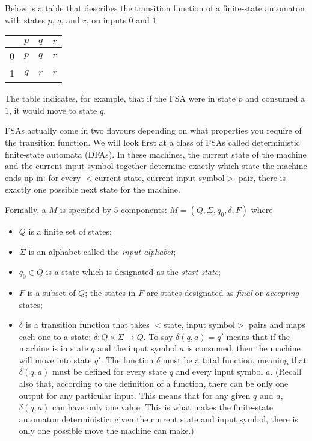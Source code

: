 \begin{example} Below is a table that describes the transition function of a 
finite-state automaton with states $p$, $q$, and $r$, on inputs $0$ and $1$.


\begin{center}
\begin{tabular}{|c||c|c|c|}
        \hline
        $\ $& $p$& $q$& $r$\\
        \hline
        \strut 0& $p$& $q$& $r$\\
        1& $q$& $r$& $r$\\
        \hline
     \end{tabular}
\end{center}

The table indicates, for example, 
that if the FSA were in state $p$ and consumed a $1$, it would
move to state $q$.
\end{example}
    
FSAs actually come in two flavours depending on what
properties you require of the transition function.  We will look first at a class
of FSAs called deterministic finite-state automata (DFAs).  In these
machines, the current state of the machine and the current input symbol together
determine exactly which state the machine ends up in: for every $<$current state,
current input symbol$>$ pair, there is exactly one possible next state for the
machine.

\smallskip

\begin{definition}
Formally,
a  $M$ is specified by 5 components:
$M=(Q, \Sigma, q_0, \delta, F)$ where
\begin{itemize} 
\item $Q$ is a finite set of states; 
\item $\Sigma$ is an alphabet called the {\em input alphabet}; 
\item $q_0 \in Q$ is a state which is designated as the {\em start state}; 
\item $F$ is a subset of $Q$; the states in $F$ are states designated as 
{\em final} or {\em accepting}  states; 
\item $\delta$ is a transition function that takes 
$<$state, input symbol$>$ pairs and maps each one to a state: $\delta : Q \times
\Sigma \rightarrow Q$.  To say
$\delta(q,a) = q'$ means that
if the machine is in state $q$ and the input symbol $a$ is consumed, then the
machine will move into state $q'$.  The function $\delta$ must be a total
function, meaning that $\delta(q,a)$ must be defined for every state $q$ and
every input symbol $a$.  (Recall also that, according to the definition of a
function, there can be only one output for any particular input.  This means
that for any given $q$ and $a$, $\delta(q,a)$ can have only one value.  This is
what makes the finite-state automaton deterministic: given the current state and
input symbol, there is only one possible move the machine can make.)
\end{itemize}
\end{definition}

